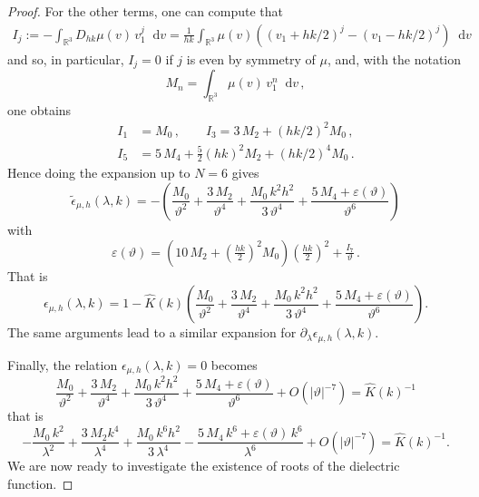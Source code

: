\documentclass[a4paper,12pt]{amsart} %
\theoremstyle{plain}
\theoremstyle{definition}
\newcommand		{\RR}		{\mathbb R}			%
\newcommand		{\R}		{\RR}
\newcommand		{\Rd}		{\R^3}
\newcommand		{\lt}			{\left}				%
\newcommand		{\rt}			{\right}			%
\renewcommand	{\(}			{\lt(}
\renewcommand	{\)}			{\rt)}
\newcommand		{\n}[1]			{\lt\lvert{#1}\rt\rvert}	%
\renewcommand		{\d}		{\mathop{}\!\mathrm{d}}		%
\newcommand		{\intd}			{\int_{\Rd}}
\newcommand		{\eps}			{\varepsilon}
\newcommand	{\h}			{h}
\begin{document}
\begin{proof}
		For the other terms, one can compute that
		\begin{align*}
			I_j := -\intd D_{h k}\mu(v)\, v_1^j\d v = \frac{1}{hk}\intd \mu(v)\( \(v_1+hk/2\)^j - \(v_1-hk/2\)^j\)\d v
		\end{align*}
		and so, in particular, $I_j = 0$ if $j$ is even by symmetry of $\mu$, and, with the notation 
		\begin{equation*}
		M_n = \intd \mu(v) \, v_1^n \d v \, ,
		\end{equation*}
		one obtains
		\begin{align*}
			I_1 &= M_0\, , \qquad I_3 = 3\, M_2 + \lt(hk/2\rt)^2 M_0 \, ,
			\\
			I_5 &= 5 \, M_4 + \frac{5}{2} \(hk\)^2 M_2 + \lt(hk/2\rt)^4 M_0 \, .
		\end{align*}
		Hence doing the expansion up to $N = 6$ gives
		\begin{equation}\label{eq:expansion_tildeps}
			\tilde\epsilon_{\mu,\h}(\lambda,k) 
			= -\(\frac{M_0}{\vartheta^2} + \frac{3\,M_2}{\vartheta^4} + \frac{M_0\,k^2 h^2}{3\,\vartheta^4} 
			+ \frac{5\,M_4 + \eps(\vartheta)}{\vartheta^6}\)
		\end{equation}
		with
		\begin{equation*}
			\eps(\vartheta) = \(10\, M_2 + \(\tfrac{hk}{2}\)^2 M_0\) \(\tfrac{hk}{2}\)^2 + \tfrac{I_7}{\vartheta}\,.
		\end{equation*}
		That is
		\begin{equation*}
			\epsilon_{\mu,\h}(\lambda,k) = 1 - \widehat{K}(k) \(\frac{M_0}{\vartheta^2} + \frac{3\,M_2}{\vartheta^4} + \frac{M_0\,k^2h^2}{3\,\vartheta^4} + \frac{5\,M_4 + \eps(\vartheta)}{\vartheta^6}\).
		\end{equation*}
		The same arguments lead to a similar expansion for $\partial_\lambda \epsilon_{\mu,\h}(\lambda,k)$.
		
		Finally, the relation $\epsilon_{\mu,\h}(\lambda,k) = 0$ becomes
		\begin{equation*}
			\frac{M_0}{\vartheta^2} + \frac{3\,M_2}{\vartheta^4} + \frac{M_0\,k^2 h^2}{3\,\vartheta^4} + \frac{5\,M_4 + \eps(\vartheta)}{\vartheta^6}+ O(\n{\vartheta}^{-7}) = \widehat{K}(k)^{-1}
		\end{equation*}
		that is
		\begin{equation*}
			-\frac{M_0\,k^2}{\lambda^2} + \frac{3\,M_2k^4}{\lambda^4} + \frac{M_0\,k^6h^2}{3\,\lambda^4} - \frac{5\,M_4\,k^6 + \eps(\vartheta)\,k^6}{\lambda^6}+ O(\n{\vartheta}^{-7}) = \widehat{K}(k)^{-1}.
		\end{equation*}
		We are now ready to investigate the existence of roots of the dielectric function.
	

\end{proof}
\end{document}
